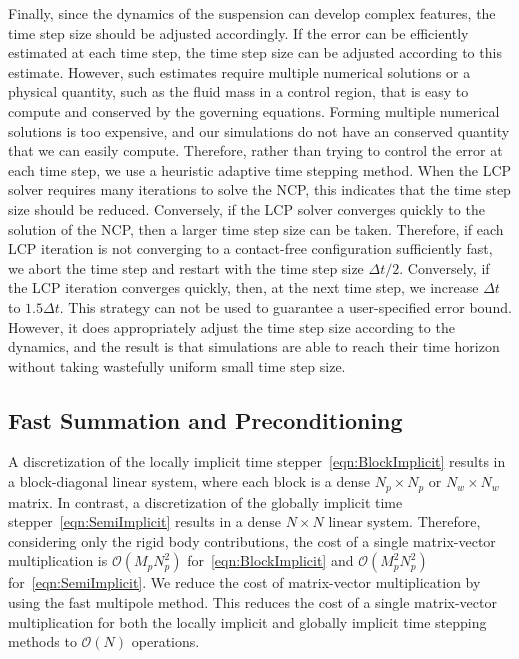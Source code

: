 \documentclass[AMA,STIX1COL]{WileyNJD-v2}
\begin{document}
Finally, since the dynamics of the suspension can develop complex
features, the time step size should be adjusted accordingly.  If the
error can be efficiently estimated at each time step, the time step size
can be adjusted according to this estimate.  However, such estimates
require multiple numerical solutions or a physical quantity, such as the
fluid mass in a control region, that is easy to compute and conserved by
the governing equations.  Forming multiple numerical solutions is too
expensive, and our simulations do not have an conserved quantity that we
can easily compute.  Therefore, rather than trying to control the error
at each time step, we use a heuristic adaptive time stepping method.
When the LCP solver requires many iterations to solve the NCP, this
indicates that the time step size should be reduced.  Conversely, if the
LCP solver converges quickly to the solution of the NCP, then a larger
time step size can be taken.  Therefore, if each LCP iteration is not
converging to a contact-free configuration sufficiently fast, we abort
the time step and restart with the time step size $\Delta t/2$.
Conversely, if the LCP iteration converges quickly, then, at the next
time step, we increase $\Delta t$ to $1.5\Delta t$. This strategy can
not be used to guarantee a user-specified error bound.  However, it does
appropriately adjust the time step size according to the dynamics, and
the result is that simulations are able to reach their time horizon
without taking wastefully uniform small time step size.

\subsection{Fast Summation and Preconditioning}
\label{sec:fast}
A discretization of the locally implicit time
stepper~\eqref{eqn:BlockImplicit} results in a block-diagonal linear
system, where each block is a dense $N_p \times N_p$ or $N_w \times N_w$
matrix.  In contrast, a discretization of the globally implicit time
stepper~\eqref{eqn:SemiImplicit} results in a dense $N \times N$ linear
system.  Therefore, considering only the rigid body contributions, the
cost of a single matrix-vector multiplication is $\mathcal{O}(M_p
N_p^2)$ for~\eqref{eqn:BlockImplicit} and $\mathcal{O}(M_p^2 N_p^2)$
for~\eqref{eqn:SemiImplicit}.  We reduce the cost of matrix-vector
multiplication by using the fast multipole method.  This reduces the
cost of a single matrix-vector multiplication for both the locally
implicit and globally implicit time stepping methods to $\mathcal{O}(N)$
operations.
\end{document}
